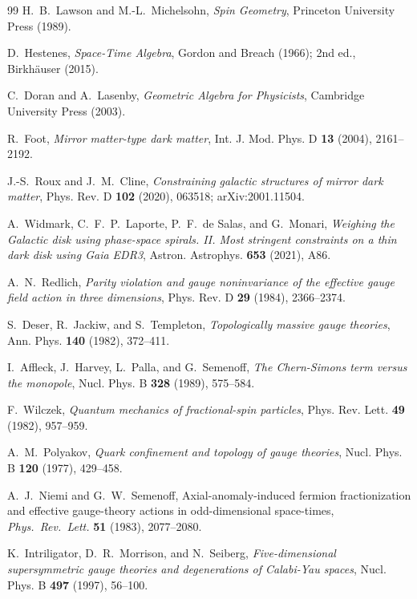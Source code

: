 \documentclass[11pt]{article}
\theoremstyle{definition}
\begin{document}
\begin{thebibliography}{99}
H.~B.~Lawson and M.-L.~Michelsohn,
\emph{Spin Geometry},
Princeton University Press (1989).

D.~Hestenes,
\emph{Space-Time Algebra},
Gordon and Breach (1966); 2nd ed., Birkh\"auser (2015).

C.~Doran and A.~Lasenby,
\emph{Geometric Algebra for Physicists},
Cambridge University Press (2003).

R.~Foot,
\emph{Mirror matter-type dark matter},
Int. J. Mod. Phys. D \textbf{13} (2004), 2161--2192.

J.-S.~Roux and J.~M.~Cline,
\emph{Constraining galactic structures of mirror dark matter},
Phys. Rev. D \textbf{102} (2020), 063518; arXiv:2001.11504.

A.~Widmark, C.~F.~P.~Laporte, P.~F.~de Salas, and G.~Monari,
\emph{Weighing the Galactic disk using phase-space spirals. II. Most stringent constraints on a thin dark disk using Gaia EDR3},
Astron. Astrophys. \textbf{653} (2021), A86.

A.~N.~Redlich,
\emph{Parity violation and gauge noninvariance of the effective gauge field action in three dimensions},
Phys. Rev. D \textbf{29} (1984), 2366--2374.

S.~Deser, R.~Jackiw, and S.~Templeton,
\emph{Topologically massive gauge theories},
Ann. Phys. \textbf{140} (1982), 372--411.

I.~Affleck, J.~Harvey, L.~Palla, and G.~Semenoff,
\emph{The Chern-Simons term versus the monopole},
Nucl. Phys. B \textbf{328} (1989), 575--584.

F.~Wilczek,
\emph{Quantum mechanics of fractional-spin particles},
Phys. Rev. Lett. \textbf{49} (1982), 957--959.

A.~M.~Polyakov,
\emph{Quark confinement and topology of gauge theories},
Nucl. Phys. B \textbf{120} (1977), 429--458.

A.~J.~Niemi and G.~W.~Semenoff,
Axial-anomaly-induced fermion fractionization and effective gauge-theory actions in odd-dimensional space-times,
\emph{Phys.~Rev.~Lett.} \textbf{51} (1983), 2077--2080.

K.~Intriligator, D.~R.~Morrison, and N.~Seiberg,
\emph{Five-dimensional supersymmetric gauge theories and degenerations of Calabi-Yau spaces},
Nucl. Phys. B \textbf{497} (1997), 56--100.


\end{thebibliography}
\end{document}
